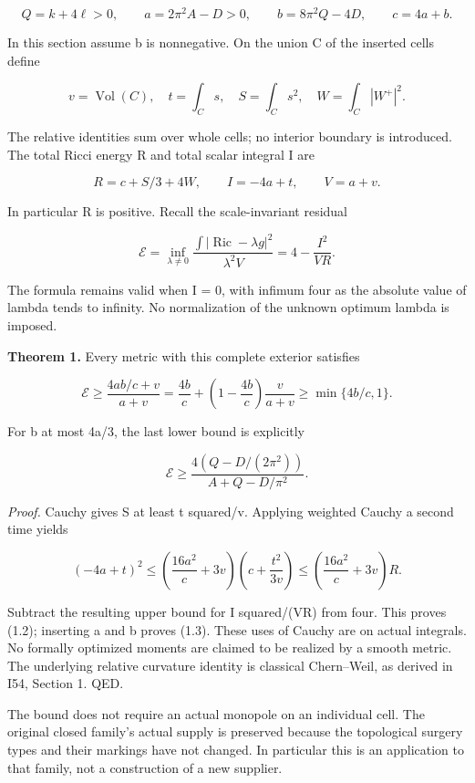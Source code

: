 \documentclass[
  10pt,
]{article}
\begin{document}
\[
 Q=k+4\ell>0,\qquad a=2\pi^2A-D>0,\qquad
 b=8\pi^2Q-4D,\qquad c=4a+b.
\]

In this section assume b is nonnegative. On the union C of the inserted
cells define

\[
 v=\operatorname{Vol}(C),\quad t=\int_Cs,\quad
 S=\int_Cs^2,\quad W=\int_C|W^+|^2.
\]

The relative identities sum over whole cells; no interior boundary is
introduced. The total Ricci energy R and total scalar integral I are

\[
 R=c+S/3+4W,\qquad I=-4a+t,\qquad V=a+v.                 \tag{1.1}
\]

In particular R is positive. Recall the scale-invariant residual

\[
 \mathcal E=\inf_{\lambda\ne0}
 \frac{\int|\operatorname{Ric}-\lambda g|^2}{\lambda^2 V}
          =4-\frac{I^2}{VR}.
\]

The formula remains valid when I = 0, with infimum four as the absolute
value of lambda tends to infinity. No normalization of the unknown
optimum lambda is imposed.

\textbf{Theorem 1.} Every metric with this complete exterior satisfies

\[
 \boxed{\mathcal E\ge
 \frac{4ab/c+v}{a+v}
 =\frac{4b}{c}+\left(1-\frac{4b}{c}\right)\frac{v}{a+v}
 \ge\min\{4b/c,1\}.}                                   \tag{1.2}
\]

For b at most 4a/3, the last lower bound is explicitly

\[
 \boxed{\mathcal E\ge
 \frac{4(Q-D/(2\pi^2))}{A+Q-D/\pi^2}.}                  \tag{1.3}
\]

\emph{Proof.} Cauchy gives S at least t squared/v. Applying weighted
Cauchy a second time yields

\[
 (-4a+t)^2\le
 \left(\frac{16a^2}{c}+3v\right)
 \left(c+\frac{t^2}{3v}\right)
 \le\left(\frac{16a^2}{c}+3v\right)R.
\]

Subtract the resulting upper bound for I squared/(VR) from four. This
proves (1.2); inserting a and b proves (1.3). These uses of Cauchy are
on actual integrals. No formally optimized moments are claimed to be
realized by a smooth metric. The underlying relative curvature identity
is classical Chern--Weil, as derived in I54, Section 1. QED.

The bound does not require an actual monopole on an individual cell. The
original closed family's actual supply is preserved because the
topological surgery types and their markings have not changed. In
particular this is an application to that family, not a construction of
a new supplier.
\end{document}
